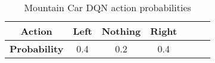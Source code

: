 \begin{table}[H]
  \centering
  \begin{tabular}{|c|c|c|c|c|c|c|}
    \hline
    \textbf{Action}      & Left & Nothing & Right \\
    \hline
    \textbf{Probability} & 0.4  & 0.2     & 0.4   \\
    \hline
  \end{tabular}
  \caption{Mountain Car DQN action probabilities} \label{table:mountain_car_dqn_probs}
\end{table}
